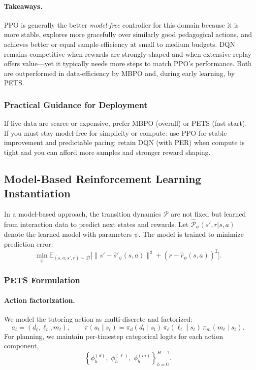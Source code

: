 \documentclass[preprint,12pt]{elsarticle}
\begin{document}
\begin{frontmatter}
\paragraph{Takeaways.} 
PPO is generally the better \emph{model-free} controller for this domain because it is more stable, explores more gracefully over similarly good pedagogical actions, and achieves better or equal sample-efficiency at small to medium budgets. DQN remains competitive when rewards are strongly shaped and when extensive replay offers value—yet it typically needs more steps to match PPO’s performance. Both are outperformed in data-efficiency by MBPO and, during early learning, by PETS.

\subsubsection{Practical Guidance for Deployment}
If live data are scarce or expensive, prefer MBPO (overall) or PETS (fast start). If you must stay model-free for simplicity or compute:
use PPO for stable improvement and predictable pacing; retain DQN (with PER) when compute is tight and you can afford more samples and stronger reward shaping.

\subsection{Model-Based Reinforcement Learning Instantiation}
In a model-based approach, the transition dynamics $\mathcal{P}$ are not fixed but learned from interaction data to predict next states and rewards.  
Let $\hat{\mathcal{P}}_\psi(s',r|s,a)$ denote the learned model with parameters $\psi$.  
The model is trained to minimize prediction error:
\[
\min_\psi \mathbb{E}_{(s,a,s',r)\sim \mathcal{D}} \Big[ \|s' - \hat{s}'_\psi(s,a)\|^2 + (r - \hat{r}_\psi(s,a))^2 \Big].
\]

\subsubsection{PETS Formulation}

\paragraph{Action factorization.}
We model the tutoring action as multi-discrete and factorized:
\begin{equation}
a_t = (d_t,\ell_t,m_t), \qquad
\pi(a_t \mid s_t) = \pi_d(d_t \mid s_t)\,\pi_\ell(\ell_t \mid s_t)\,\pi_m(m_t \mid s_t).
\label{eq:pets_action_factorization}
\end{equation}
For planning, we maintain per-timestep categorical logits for each action component,
\begin{equation}
\left\{\phi^{(d)}_h,\;\phi^{(\ell)}_h,\;\phi^{(m)}_h\right\}_{h=0}^{H-1}.
\label{eq:pets_logits}
\end{equation}


\end{frontmatter}
\end{document}
